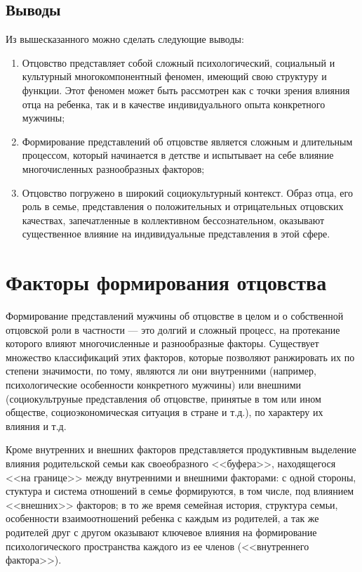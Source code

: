 \documentclass{../../common/thesisbyxetex}
\begin{document}
\section*{Выводы}

Из вышесказанного можно сделать следующие выводы:

\begin{enumerate}
 \item Отцовство представляет собой сложный психологический, социальный и культурный  
многокомпонентный феномен, имеющий свою структуру и функции. Этот феномен может быть рассмотрен как 
с точки зрения влияния отца на ребенка, так и в качестве индивидуального опыта конкретного мужчины;

\item Формирование представлений об отцовстве является сложным и длительным процессом, который 
начинается в детстве и испытывает на себе влияние многочисленных разнообразных факторов;

  \item Отцовство погружено в широкий социокультурный контекст. Образ отца, его роль в семье, 
представления о положительных и отрицательных отцовских качествах, запечатленные в коллективном 
бессознательном, оказывают существенное влияние на индивидуальные представления в этой сфере.
\end{enumerate}



\chapter{Факторы формирования отцовства}

Формирование представлений мужчины об отцовстве в целом и о собственной отцовской роли в частности
--- это долгий и сложный процесс, на протекание которого влияют многочисленные и разнообразные
факторы. Существует множество классификаций этих факторов, которые позволяют ранжировать их по
степени значимости, по тому, являются ли они внутренними (например, психологические особенности
конкретного мужчины) или внешними  (социокультруные представления об отцовстве, принятые в том
или ином обществе, социоэкономическая ситуация в стране и т.д.), по характеру их влияния и т.д.

Кроме внутренних и внешних факторов представляется продуктивным выделение
влияния родительской семьи как своеобразного <<буфера>>, находящегося <<на границе>>
между внутренними и внешними факторами: с одной стороны, стуктура и система отношений в семье
формируются, в том числе, под влиянием <<внешних>> факторов; в то же
время семейная история, структура семьи, особенности взаимоотношений ребенка с каждым из
родителей, а так же родителей друг с другом оказывают ключевое влияния на формирование
психологического пространства каждого из ее членов (<<внутреннего фактора>>).
\end{document}
